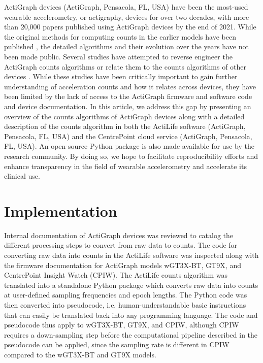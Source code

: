 \documentclass{bmcart}
\begin{document}
ActiGraph devices (ActiGraph, Pensacola, FL, USA) have been the most-used
wearable accelerometry, or actigraphy, devices for over two decades, with more
than 20,000 papers published using ActiGraph devices by the end of 2021. While
the original methods for computing counts in the earlier models have been
published \cite{tryon_fully_1996}, the detailed algorithms and their evolution
over the years have not been made public. Several studies have attempted to
reverse engineer the ActiGraph counts algorithms or relate them to the counts
algorithms of other devices \cite{brond_generating_2017, brond_sampling_2016,
	paul_comparison_2007,straker_translation_2012}. While these studies have been
critically important to gain further understanding of acceleration counts and
how it relates across devices, they have been limited by the lack of access to
the ActiGraph firmware and software code and device documentation. In this
article, we address this gap by presenting an overview of the counts algorithms
of ActiGraph devices along with a detailed description of the counts algorithm
in both the ActiLife software (ActiGraph, Pensacola, FL, USA) and the
CentrePoint cloud service (ActiGraph, Pensacola, FL, USA). An open-source
Python package is also made available for use by the research community.  By
doing so, we hope to facilitate reproducibility efforts and enhance
transparency in the field of wearable accelerometry and accelerate its clinical
use.

\section*{Implementation}
Internal documentation of ActiGraph devices was reviewed to catalog the
different processing steps to convert from raw data to counts. The code for
converting raw data into counts in the ActiLife software was inspected along
with the firmware documentation for ActiGraph models wGT3X-BT, GT9X, and
CentrePoint Insight Watch (CPIW). The ActiLife counts algorithm was translated
into a standalone Python package which converts raw data into counts at
user-defined sampling frequencies and epoch lengths. The Python code was then
converted into pseudocode, i.e. human-understandable basic instructions that
can easily be translated back into any programming language. The code and
pseudocode thus apply to wGT3X-BT, GT9X, and CPIW, although CPIW requires a
down-sampling step before the computational pipeline described in the
pseudocode can be applied, since the sampling rate is different in CPIW
compared to the wGT3X-BT and GT9X models.
\end{document}

